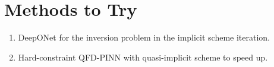 \documentclass[a4paper, 12pt]{article}
\begin{document}
\section{Methods to Try} 
\begin{enumerate}
    \item DeepONet for the inversion problem in the implicit scheme iteration. 
    \item Hard-constraint QFD-PINN with quasi-implicit scheme to speed up. 
\end{enumerate}



\end{document}
